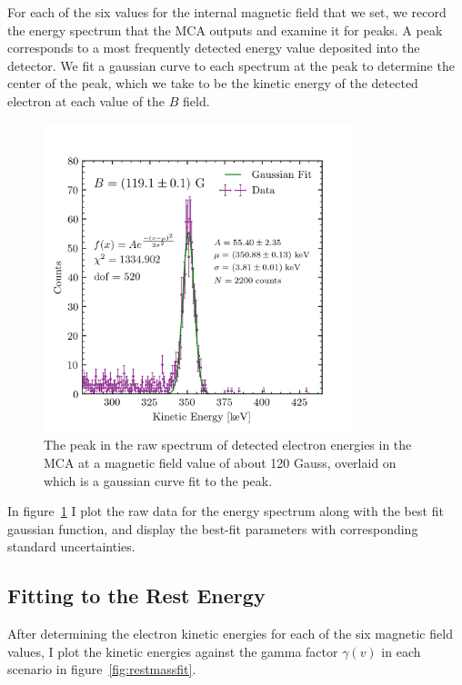 \documentclass[aps,twocolumn,secnumarabic,balancelastpage,amsmath,amssymb,nofootinbib, floatfix]{revtex4-2}
\begin{document}
	For each of the six values for the internal magnetic field that we set, we record the energy spectrum that the MCA outputs and examine it for peaks. A peak corresponds to a most frequently detected energy value deposited into the detector. We fit a gaussian curve to each spectrum at the peak to determine the center of the peak, which we take to be the kinetic energy of the detected electron at each value of the $B$ field. 
	
	\begin{figure}
		\centering
		\includegraphics[width=9cm]{espectrum_b120.png}
		\caption{The peak in the raw spectrum of detected electron energies in the MCA at a magnetic field value of about 120 Gauss, overlaid on which is a gaussian curve fit to the peak.}
		\label{fig:espectrum}
	\end{figure}
	
	In figure~\ref{fig:espectrum} I plot the raw data for the energy spectrum along with the best fit gaussian function, and display the best-fit parameters with corresponding standard uncertainties.
	
	\subsection{Fitting to the Rest Energy} 
	
	After determining the electron kinetic energies for each of the six magnetic field values, I plot the kinetic energies against the gamma factor $\gamma(v)$ in each scenario in figure~\ref{fig:restmassfit}.
	
\end{document}
